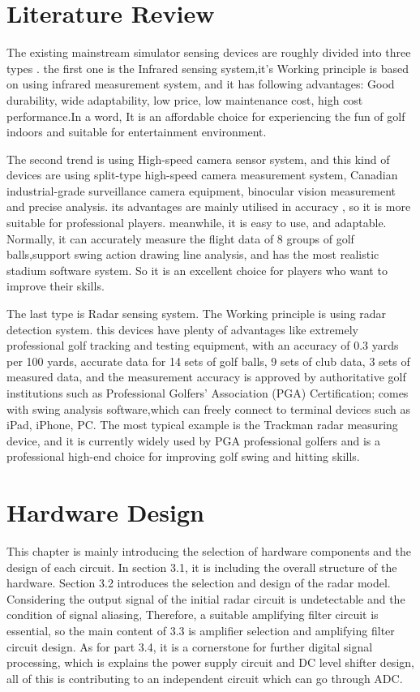 \newpage
\section{Literature Review}
The existing mainstream simulator sensing devices are roughly divided into three types \textcite{tuxen2020method}.
the first one is the Infrared sensing system,it's Working principle is based on using infrared measurement system, and it has following advantages: Good durability, wide adaptability, low price, low maintenance cost, high cost performance.In a word, It is an affordable choice for experiencing the fun of golf indoors and suitable for entertainment environment.

The second trend is using High-speed camera sensor system, and this kind of devices are using split-type high-speed camera measurement system, Canadian industrial-grade surveillance camera equipment, binocular vision measurement and precise analysis.
its advantages are mainly utilised in accuracy , so it is more suitable for professional players. meanwhile, it is easy to use, and adaptable. Normally, it can accurately measure the flight data of 8 groups of golf balls,support swing action drawing line analysis, and has the most realistic stadium software system. So it is an excellent choice for players who want to improve their skills.

The last type is Radar sensing system.  The Working principle is  using radar detection system.
this devices have plenty of advantages like extremely professional golf tracking and testing equipment, \textcite{trackmangolf} with an accuracy of 0.3 yards per 100 yards, accurate data for 14 sets of golf balls, 9 sets of club data, 3 sets of measured data, and the measurement accuracy is approved by authoritative golf institutions such as Professional Golfers' Association (PGA) Certification; comes with swing analysis software,which can freely connect to terminal devices such as iPad, iPhone, PC. The most typical example is the Trackman radar measuring device, and it is currently widely used by PGA professional golfers and is a professional high-end choice for improving golf swing and hitting skills.





\newpage
\section{Hardware Design}
This chapter is mainly introducing the selection of hardware components and the design of each circuit. In section 3.1, it is including the overall structure of the hardware. Section 3.2 introduces the selection and design of the radar model. Considering the output signal of the initial radar circuit is undetectable and the condition of signal aliasing, Therefore, a suitable amplifying filter circuit is essential, so the main content of 3.3 is amplifier selection and amplifying filter circuit design. As for part 3.4, it is a cornerstone for further digital signal processing, which is explains the power supply circuit and DC level shifter design, all of this is contributing to an independent circuit which can go through ADC.
